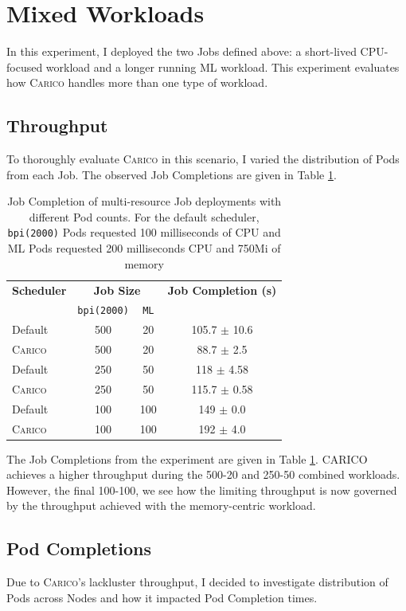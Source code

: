 \section{Mixed Workloads}
\label{sec:eval-mixed}
In this experiment, I deployed the two Jobs defined above: a short-lived
CPU-focused workload and a longer running ML workload. This experiment evaluates
how \textsc{Carico} handles more than one type of workload.

\subsection{Throughput}
To thoroughly evaluate \textsc{Carico} in this scenario, I varied the distribution of
Pods from each Job. The observed Job Completions are given in Table
\ref{tab:mixed-throughput}.

\begin{table}[H]
\centering
    \begin{tabular}{|l|c|c|c|}
    \hline
    \textbf{Scheduler} & \multicolumn{2}{c|}{\textbf{Job Size}} &
        \textbf{Job Completion (s)} \\ \cline{2-3}
        &  \texttt{bpi(2000)} & \texttt{ML} & \\
    \hline
        Default & 500 & 20 & 105.7 $\pm$ 10.6 \\
        \textsc{Carico} & 500 & 20 & 88.7 $\pm$ 2.5 \\
        Default & 250 & 50 & 118 $\pm$ 4.58 \\
        \textsc{Carico} & 250 & 50 & 115.7 $\pm$ 0.58 \\
        Default & 100 & 100 & 149 $\pm$ 0.0 \\
        \textsc{Carico} & 100 & 100 & 192 $\pm$ 4.0 \\
    \hline
    \end{tabular}
    \caption{Job Completion of multi-resource Job deployments with different Pod
    counts. For the default scheduler, \texttt{bpi(2000)} Pods requested 100
    milliseconds of CPU and ML Pods requested 200 milliseconds CPU and 750Mi of
    memory}
    \label{tab:mixed-throughput}
\end{table}
The Job Completions from the experiment are given in Table
\ref{tab:mixed-throughput}. CARICO achieves a higher throughput during the
500-20 and 250-50 combined workloads. However, the final 100-100, we see how the
limiting throughput is now governed by the throughput achieved with the
memory-centric workload.

\subsection{Pod Completions}
Due to \textsc{Carico}'s lackluster throughput, I decided to investigate distribution of
Pods across Nodes and how it impacted Pod Completion times.

